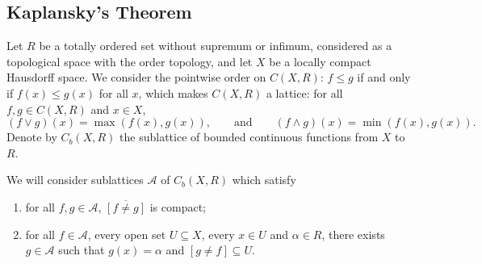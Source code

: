 \subsection{Kaplansky's Theorem}\label{subsectionkaplansky}

Let $R$ be a totally ordered set without supremum or infimum, considered as a topological space with the order topology, and let $X$ be a locally compact Hausdorff space. We consider the pointwise order on $C(X,R)$: $f\leq g$ if and only if $f(x)\leq g(x)$ for all $x$, which makes $C(X,R)$ a lattice: for all $f,g\in C(X,R)$ and $x\in X$,
\[(f\lor g)(x)=\max(f(x),g(x)),\qquad\text{and}\qquad(f\land g)(x)=\min(f(x),g(x)).\]
Denote by $C_b(X,R)$ the sublattice of bounded continuous functions from $X$ to $R$.

%

We will consider sublattices $\mathcal{A}$ of $C_b(X,R)$ which satisfy
\begin{enumerate}
\item[(L1)] for all $f,g\in\mathcal{A}$, $\overline{[f\neq g]}$ is compact;
\item[(L2)] for all $f\in\mathcal{A}$, every open set $U\subseteq X$, every $x\in U$ and $\alpha\in R$, there exists $g\in\mathcal{A}$ such that $g(x)=\alpha$ and $[g\neq f]\subseteq U$.
\end{enumerate}

